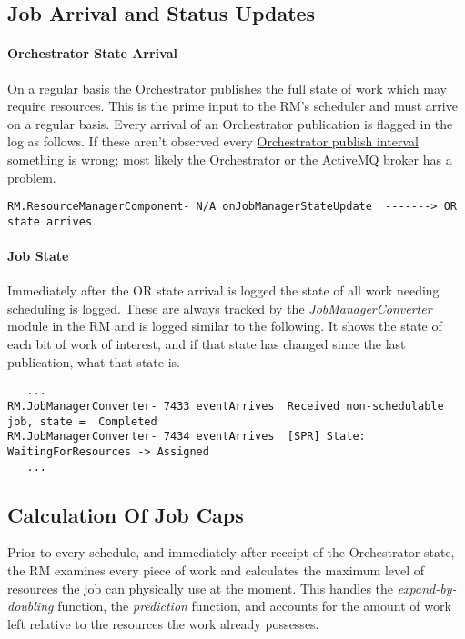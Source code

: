 \subsection{Job Arrival and Status Updates}
 
   \paragraph{Orchestrator State Arrival}

     On a regular basis the Orchestrator publishes the full state of
     work which may require resources.  This is the prime input to the
     RM's scheduler and must arrive on a regular basis.  Every arrival
     of an Orchestrator publication is flagged in the log as follows.
     If these aren't observed every
     \hyperref[itm:props-or.state.publish.rate]{Orchestrator publish
       interval} something is wrong; most likely the Orchestrator or
     the ActiveMQ broker has a problem.

\begin{verbatim}
RM.ResourceManagerComponent- N/A onJobManagerStateUpdate  -------> OR state arrives
\end{verbatim}
        
    \paragraph{Job State}
    Immediately after the OR state arrival is logged the state of all work needing scheduling
    is logged.  These are always tracked by the {\em JobManagerConverter} module in the
    RM and is logged similar to the following.  It shows the state of each bit of work
    of interest, and if that state has changed since the last publication, what that state is.
\begin{verbatim}
   ...
RM.JobManagerConverter- 7433 eventArrives  Received non-schedulable job, state =  Completed
RM.JobManagerConverter- 7434 eventArrives  [SPR] State:  WaitingForResources -> Assigned
   ...
\end{verbatim}

\subsection{Calculation Of Job Caps}
   Prior to every schedule, and immediately after receipt of the Orchestrator state,
   the RM examines every piece of work and calculates the maximum level of resources the
   job can physically use at the moment.  This handles the {\em expand-by-doubling} 
   function, the {\em prediction} function, and accounts for the amount of work left
   relative to the resources the work already possesses.

